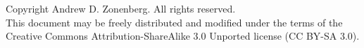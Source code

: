 Copyright  Andrew D. Zonenberg. All rights reserved. \\

This document may be freely distributed and modified under the terms of the Creative Commons Attribution-ShareAlike 3.0
Unported license (CC BY-SA 3.0).
